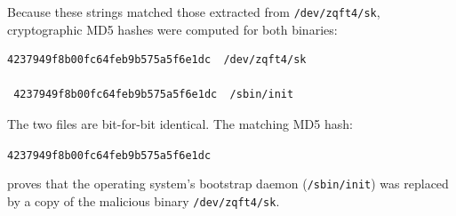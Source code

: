 \vspace{1em}

Because these strings matched those extracted from \texttt{/dev/zqft4/sk}, cryptographic MD5 hashes were computed for both binaries:

\vspace{1em}

\begin{lstlisting}[style=terminal]
 4237949f8b00fc64feb9b575a5f6e1dc  /dev/zqft4/sk

 4237949f8b00fc64feb9b575a5f6e1dc  /sbin/init
\end{lstlisting}

\vspace{1em}

The two files are bit-for-bit identical. The matching MD5 hash:
\begin{center}
\texttt{4237949f8b00fc64feb9b575a5f6e1dc}
\end{center}
proves that the operating system's bootstrap daemon (\texttt{/sbin/init}) was replaced by a copy of the malicious binary \texttt{/dev/zqft4/sk}.


